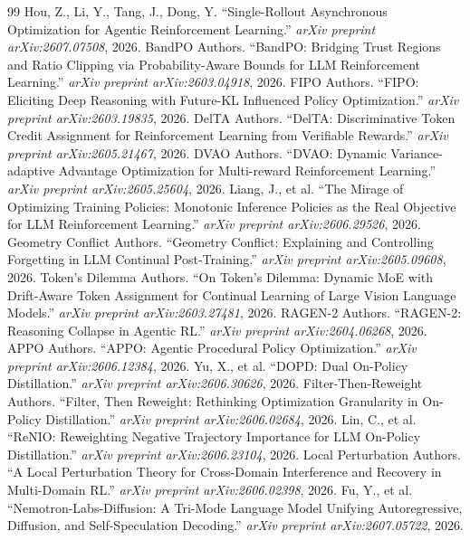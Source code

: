 \documentclass[11pt,a4paper]{article}
\begin{document}
\begin{thebibliography}{99}
 Hou, Z., Li, Y., Tang, J., Dong, Y. ``Single-Rollout Asynchronous Optimization for Agentic Reinforcement Learning.'' \emph{arXiv preprint arXiv:2607.07508}, 2026.
 BandPO Authors. ``BandPO: Bridging Trust Regions and Ratio Clipping via Probability-Aware Bounds for LLM Reinforcement Learning.'' \emph{arXiv preprint arXiv:2603.04918}, 2026.
 FIPO Authors. ``FIPO: Eliciting Deep Reasoning with Future-KL Influenced Policy Optimization.'' \emph{arXiv preprint arXiv:2603.19835}, 2026.
 DelTA Authors. ``DelTA: Discriminative Token Credit Assignment for Reinforcement Learning from Verifiable Rewards.'' \emph{arXiv preprint arXiv:2605.21467}, 2026.
 DVAO Authors. ``DVAO: Dynamic Variance-adaptive Advantage Optimization for Multi-reward Reinforcement Learning.'' \emph{arXiv preprint arXiv:2605.25604}, 2026.
 Liang, J., et al. ``The Mirage of Optimizing Training Policies: Monotonic Inference Policies as the Real Objective for LLM Reinforcement Learning.'' \emph{arXiv preprint arXiv:2606.29526}, 2026.
 Geometry Conflict Authors. ``Geometry Conflict: Explaining and Controlling Forgetting in LLM Continual Post-Training.'' \emph{arXiv preprint arXiv:2605.09608}, 2026.
 Token's Dilemma Authors. ``On Token's Dilemma: Dynamic MoE with Drift-Aware Token Assignment for Continual Learning of Large Vision Language Models.'' \emph{arXiv preprint arXiv:2603.27481}, 2026.
 RAGEN-2 Authors. ``RAGEN-2: Reasoning Collapse in Agentic RL.'' \emph{arXiv preprint arXiv:2604.06268}, 2026.
 APPO Authors. ``APPO: Agentic Procedural Policy Optimization.'' \emph{arXiv preprint arXiv:2606.12384}, 2026.
 Yu, X., et al. ``DOPD: Dual On-Policy Distillation.'' \emph{arXiv preprint arXiv:2606.30626}, 2026.
 Filter-Then-Reweight Authors. ``Filter, Then Reweight: Rethinking Optimization Granularity in On-Policy Distillation.'' \emph{arXiv preprint arXiv:2606.02684}, 2026.
 Lin, C., et al. ``ReNIO: Reweighting Negative Trajectory Importance for LLM On-Policy Distillation.'' \emph{arXiv preprint arXiv:2606.23104}, 2026.
 Local Perturbation Authors. ``A Local Perturbation Theory for Cross-Domain Interference and Recovery in Multi-Domain RL.'' \emph{arXiv preprint arXiv:2606.02398}, 2026.
 Fu, Y., et al. ``Nemotron-Labs-Diffusion: A Tri-Mode Language Model Unifying Autoregressive, Diffusion, and Self-Speculation Decoding.'' \emph{arXiv preprint arXiv:2607.05722}, 2026.
\end{thebibliography}
\end{document}
